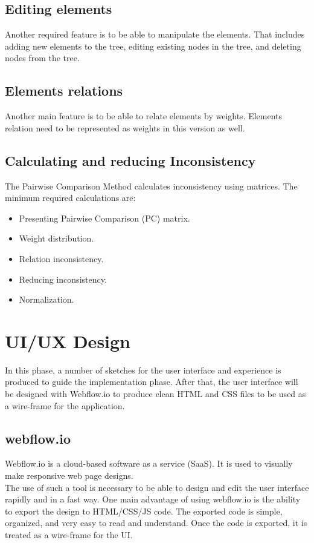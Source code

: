 \documentclass[11pt]{article} %
\begin{document}
\subsection{Editing elements}
Another required feature is to be able to manipulate the elements. That includes adding new elements to the tree, editing existing nodes in the tree, and deleting nodes from the tree.

\subsection{Elements relations}
Another main feature is to be able to relate elements by weights. Elements relation need to be represented as weights in this version as well.

\subsection{Calculating and reducing Inconsistency}
The Pairwise Comparison Method calculates inconsistency using matrices. The minimum required calculations are:

\begin{itemize}
\item Presenting Pairwise Comparison (PC) matrix.
\item Weight distribution.
\item Relation inconsistency.
\item Reducing inconsistency.
\item Normalization.
\end{itemize}

\section{UI/UX Design}
In this phase, a number of sketches for the  user interface and experience is produced to guide the implementation phase. After that, the user interface will be designed with Webflow.io to produce clean HTML and CSS files to be used as a wire-frame for the application.

\subsection{webflow.io}
Webflow.io is a cloud-based software as a service (SaaS). It is used to visually make responsive web page designs.\\
The use of such a tool is necessary to be able to design and edit the user interface rapidly and in a fast way. One main advantage of using webflow.io is the ability to export the design to HTML/CSS/JS code. The exported code is simple, organized, and very easy to read and understand. Once the code is exported, it is treated as a wire-frame for the UI.
\end{document}
